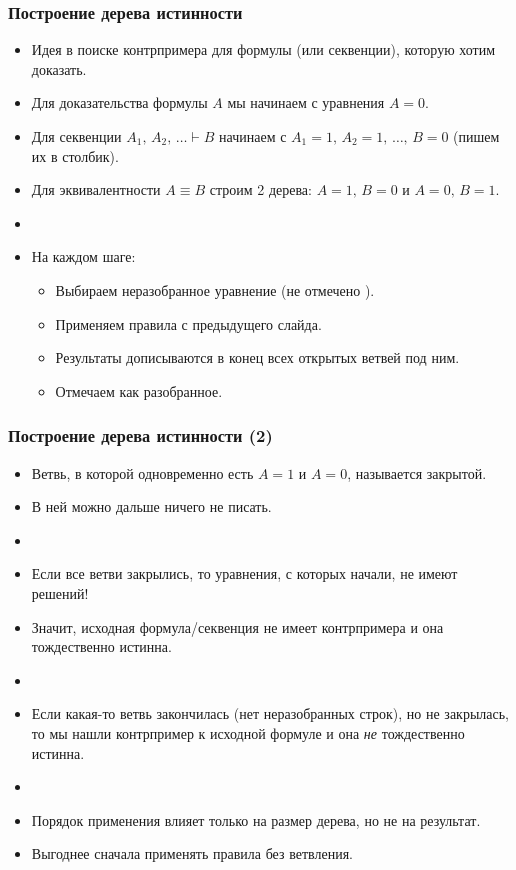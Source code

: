 \documentclass[10pt]{beamer}
\begin{document}
\begin{frame}
\frametitle{Построение дерева истинности}
\begin{itemize}
    \item Идея в поиске контрпримера для формулы (или секвенции), которую хотим доказать.
    \item Для доказательства формулы $A$ мы начинаем с уравнения $A=0$.
    \item Для секвенции $A_1,\, A_2,\,\ldots \vdash B$ начинаем с \pause $A_1=1,\, A_2=1,\, \ldots,\, B=0$ (пишем их в столбик).
    \item Для эквивалентности $A \equiv B$ строим 2 дерева: \pause $A=1,\, B=0$ и $A=0,\, B=1$.
    \pause
    \item[]
    \item На каждом шаге:
    \begin{itemize}
        \item Выбираем неразобранное уравнение (не отмечено \checkmark).
        \item Применяем правила с предыдущего слайда.
        \item Результаты дописываются в конец всех открытых ветвей под ним.
        \item Отмечаем как разобранное.
    \end{itemize}
\end{itemize}
\end{frame}

\begin{frame}
\frametitle{Построение дерева истинности (2)}
\begin{itemize}
    \item Ветвь, в которой одновременно есть $A=1$ и $A=0$, называется закрытой.
    \item В ней можно дальше ничего не писать.
    \item[]
    \item Если все ветви закрылись, то уравнения, с которых начали, не имеют решений! 
    \item Значит, исходная формула/секвенция не имеет контрпримера и она тождественно истинна.
    \item[]
    \pause
    \item Если какая-то ветвь закончилась (нет неразобранных строк), но не закрылась, то мы нашли контрпример к исходной формуле и она \emph{не} тождественно истинна.
    \item[]
    \pause
    \item Порядок применения влияет только на размер дерева, но не на результат.
    \item Выгоднее сначала применять правила без ветвления.
\end{itemize}
\end{frame}
\end{document}
